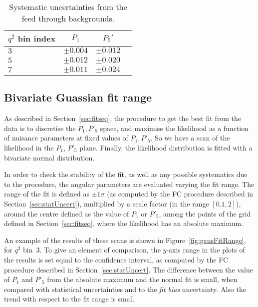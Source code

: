 \begin{table*}[!htb]
  \begin {center}
    \begin{small}
      \caption{Systematic uncertainties from the feed through backgrounds.
        \label{tab:feed-through}}
      \begin{tabular}{l|c|c|c}
        $q^2$ bin index & $P_1$ & $P_5'$ \\
        \hline
        $3$ & $\pm 0.004$ & $\pm 0.012$ \\
        $5$ & $\pm 0.012$ & $\pm 0.020$ \\
        $7$ & $\pm 0.011$ & $\pm 0.024$ \\
      \end{tabular}
    \end{small}
  \end{center}
\end{table*}

\subsection{Bivariate Guassian fit range}\label{sec:bestFit}

As described in Section~\ref{sec:fitseq}, the procedure to get the best fit from the data is to discretise the $P_1,P'_5$ space, and maximise the likelihood as a function of nuisance parameters at fixed values of $P_1,P'_5$.
So we have a scan of the likelihood in the $P_1$, $P'_5$ plane.
Finally, the likelihood distribution is fitted with a bivariate normal distribution.

In order to check the stability of the fit, as well as any possible systematics due to the procedure, the angular parameters are evaluated varying the fit range.
The range of the fit is defined as $\pm1\sigma$ (as computed by the FC procedure described in Section~\ref{sec:statUncert}), multiplied by a scale factor (in the range $[0.1,2]$), around the centre defined as the value of $P_1$ or $P'_5$, among the points of the grid defined in Section~\ref{sec:fitseq}, where the likelihood has an absolute maximum.

An example of the results of these scans is shown in Figure~\ref{fig:gausFitRange}, for $q^2$ bin~3.
To give an element of comparison, the $y$-axis range in the plots of the results is set equal to the confidence interval, as computed by the FC procedure described in Section~\ref{sec:statUncert}. 
The difference between the value of $P_1$ and $P'_5$ from the absolute maximum and the normal fit is small, when compared with statistical uncertainties and to the \textit{fit bias} uncertainty.
Also the trend with respect to the fit range is small.

